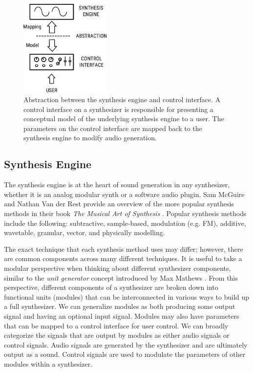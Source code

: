 \begin{figure}[ht]
    \centering
    \includegraphics[width=0.4\textwidth]{figures/background/Synth Abstraction Model.pdf}
    \caption{Abstraction between the synthesis engine and control interface. A control interface on a synthesizer is responsible for presenting a conceptual model of the underlying synthesis engine to a user. The parameters on the control interface are mapped back to the synthesis engine to modify audio generation.}
    \label{fig:synth_abstraction}
\end{figure}

\subsection{Synthesis Engine}
The synthesis engine is at the heart of sound generation in any synthesizer, whether it is an analog modular synth or a software audio plugin. Sam McGuire and Nathan Van der Rest provide an overview of the more popular synthesis methods in their book \textit{The Musical Art of Synthesis} \cite{mcguire2015musical}. Popular synthesis methods include the following: subtractive, sample-based, modulation (e.g. FM), additive, wavetable, granular, vector, and physically modelling. 

The exact technique that each synthesis method uses may differ; however, there are common components across many different techniques. It is useful to take a modular perspective when thinking about different synthesizer components, similar to the \textit{unit generator} concept introduced by Max Mathews \cite{roads1980interview}. From this perspective, different components of a synthesizer are broken down into functional units (modules) that can be interconnected in various ways to build up a full synthesizer. We can generalize modules as both producing some output signal and having an optional input signal. Modules may also have parameters that can be mapped to a control interface for user control. We can broadly categorize the signals that are output by modules as either audio signals or control signals. Audio signals are generated by the synthesizer and are ultimately output as a sound. Control signals are used to modulate the parameters of other modules within a synthesizer.

